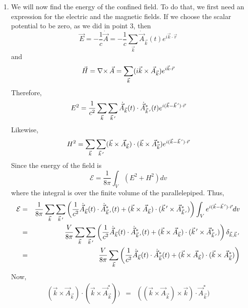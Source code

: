\begin{enumerate}
\item We will now find the energy of the confined field. To do that, we first 
need an expression for the electric and the magnetic fields. If we choose the
scalar potential to be zero, as we did in point 3, then
\begin{equation}\label{c6e126}
\vec{E} = -\frac{1}{c}\dot{\vec{A}} = 
-\frac{1}{c}\sum_{\vec{k}}\dot{\vec{A}}_{\vec{k}}(t) e^{i\vec{k}\cdot\vec{r}}
\end{equation}
and
\begin{equation}\label{c6e127}
\vec{H} = \operatorname{\nabla\times}\vec{A} = \sum_{\vec{k}}(i\vec{k}\times\vec{A}_{\vec{k}})e^{i\vec{k}\cdot\vec{r}}
\end{equation}
Therefore,
\begin{equation}\label{c6e128}
E^2 = \frac{1}{c^2}\sum_{\vec{k}}\sum_{\vec{k}^{\,\prime}}
\dot{\vec{A}}_{\vec{k}}(t)\cdot\dot{\vec{A}}_{\vec{k}^{\,\prime}}^\ast(t)
e^{i(\vec{k}-\vec{k}^{\,\prime})\cdot\vec{r}}
\end{equation}
Likewise,
\begin{equation}\label{c6e129}
H^2 = \sum_{\vec{k}}\sum_{\vec{k}^{\,\prime}}(\vec{k}\times\vec{A}_{\vec{k}})\cdot
(\vec{k}\times\vec{A}_{\vec{k}}^\ast)e^{i(\vec{k}-\vec{k}^{\,\prime})\cdot\vec{r}}
\end{equation}
Since the energy of the field is
\[
\mathcal{E} = \frac{1}{8\pi}\int_V (E^2 + H^2)dv
\]
where the integral is over the finite volume of the parallelepiped. Thus,
\begin{eqnarray*}
\mathcal{E} &=& \frac{1}{8\pi}\sum_{\vec{k}}\sum_{\vec{k}^{\,\prime}}
\left(\frac{1}{c^2}\dot{\vec{A}}_{\vec{k}}(t)\cdot\dot{\vec{A}}_{\vec{k}^{\,\prime}}^\ast(t) +
(\vec{k}\times\vec{A}_{\vec{k}})\cdot(\vec{k}^{\,\prime}\times\vec{A}_{\vec{k}^{\,\prime}}^\ast)\right)
\int_V e^{i(\vec{k}-\vec{k}^{\,\prime})\cdot\vec{r}} dv \\
&=& \frac{V}{8\pi}\sum_{\vec{k}}\sum_{\vec{k}^{\,\prime}}
\left(\frac{1}{c^2}\dot{\vec{A}}_{\vec{k}}(t)\cdot\dot{\vec{A}}_{\vec{k}^{\,\prime}}^\ast(t) +
(\vec{k}\times\vec{A}_{\vec{k}})\cdot(\vec{k}^{\,\prime}\times\vec{A}_{\vec{k}^{\,\prime}}^\ast)\right)
\delta_{\vec{k}, \vec{k}^{\,\prime}} \\
&=& \frac{V}{8\pi}\sum_{\vec{k}}
\left(\frac{1}{c^2}\dot{\vec{A}}_{\vec{k}}(t)\cdot\dot{\vec{A}}_{\vec{k}}^\ast(t) +
(\vec{k}\times\vec{A}_{\vec{k}})\cdot(\vec{k}\times\vec{A}_{\vec{k}}^\ast)\right)
\end{eqnarray*}
Now,
\begin{eqnarray*}
(\vec{k}\times\vec{A}_{\vec{k}})\cdot(\vec{k}\times\vec{A}_{\vec{k}}^\ast)) 
&=& ((\vec{k}\times\vec{A}_{\vec{k}})\times\vec{k})\cdot\vec{A}_{\vec{k}}^\ast) \\

\end{eqnarray*}
\end{enumerate}
